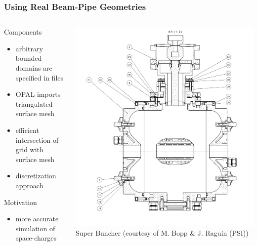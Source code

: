 \documentclass[xcolor=pdftex,table,10pt]{beamer}
\newcommand{\opal}{\textsc{OPAL }}
\begin{document}
	\begin{frame}
		\frametitle{Using Real Beam-Pipe Geometries}

		\begin{columns}
		\begin{column}{5cm}
			\begin{exampleblock}{Components}
			\begin{itemize}
				\item arbitrary bounded domains are specified in files
				\item \opal imports triangulated surface mesh
				\item efficient intersection of grid with surface mesh
				\item discretization approach
			\end{itemize}
			\end{exampleblock}
			\begin{block}{Motivation}
			\begin{itemize}
				\item more accurate simulation of space-charges
			\end{itemize}
			\end{block}
		\end{column}
		\begin{column}{5cm}
            \centering
			\includegraphics[width=1.0\textwidth]{superbuncher.png} \\
			\scriptsize{Super Buncher (courtesy of M. Bopp \& J. Raguin (PSI))}
		\end{column}
		\end{columns}

	\end{frame}
\end{document}
